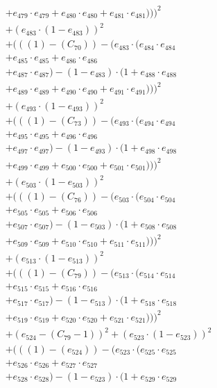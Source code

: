 \documentclass[10pt, a4paper]{article}
\begin{document}
\begin{small}
\begin{align*}
& + e_{479} \cdot e_{479} + e_{480} \cdot e_{480} + e_{481} \cdot e_{481})))^{2} \\
& + (e_{483} \cdot (1 - e_{483}))^{2} \\
& + (((1) - (C_{70})) - (e_{483} \cdot (e_{484} \cdot e_{484} \\
& + e_{485} \cdot e_{485} + e_{486} \cdot e_{486} \\
& + e_{487} \cdot e_{487}) - (1 - e_{483}) \cdot (1 + e_{488} \cdot e_{488} \\
& + e_{489} \cdot e_{489} + e_{490} \cdot e_{490} + e_{491} \cdot e_{491})))^{2} \\
& + (e_{493} \cdot (1 - e_{493}))^{2} \\
& + (((1) - (C_{73})) - (e_{493} \cdot (e_{494} \cdot e_{494} \\
& + e_{495} \cdot e_{495} + e_{496} \cdot e_{496} \\
& + e_{497} \cdot e_{497}) - (1 - e_{493}) \cdot (1 + e_{498} \cdot e_{498} \\
& + e_{499} \cdot e_{499} + e_{500} \cdot e_{500} + e_{501} \cdot e_{501})))^{2} \\
& + (e_{503} \cdot (1 - e_{503}))^{2} \\
& + (((1) - (C_{76})) - (e_{503} \cdot (e_{504} \cdot e_{504} \\
& + e_{505} \cdot e_{505} + e_{506} \cdot e_{506} \\
& + e_{507} \cdot e_{507}) - (1 - e_{503}) \cdot (1 + e_{508} \cdot e_{508} \\
& + e_{509} \cdot e_{509} + e_{510} \cdot e_{510} + e_{511} \cdot e_{511})))^{2} \\
& + (e_{513} \cdot (1 - e_{513}))^{2} \\
& + (((1) - (C_{79})) - (e_{513} \cdot (e_{514} \cdot e_{514} \\
& + e_{515} \cdot e_{515} + e_{516} \cdot e_{516} \\
& + e_{517} \cdot e_{517}) - (1 - e_{513}) \cdot (1 + e_{518} \cdot e_{518} \\
& + e_{519} \cdot e_{519} + e_{520} \cdot e_{520} + e_{521} \cdot e_{521})))^{2} \\
& + (e_{524} - (C_{79} - 1))^{2} + (e_{523} \cdot (1 - e_{523}))^{2} \\
& + (((1) - (e_{524})) - (e_{523} \cdot (e_{525} \cdot e_{525} \\
& + e_{526} \cdot e_{526} + e_{527} \cdot e_{527} \\
& + e_{528} \cdot e_{528}) - (1 - e_{523}) \cdot (1 + e_{529} \cdot e_{529} \\

\end{align*}
\end{small}
\end{document}
